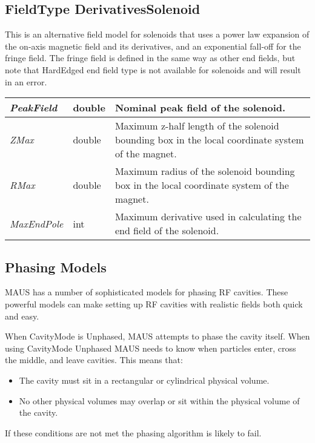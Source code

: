 \subsection{FieldType DerivativesSolenoid}
This is an alternative field model for solenoids that uses a power law expansion of the on-axis magnetic field and its
derivatives, and an exponential fall-off for the fringe field. The fringe field is defined in the same way as other end
fields, but note that HardEdged end field type is not available for solenoids and will result in an error.

\begin{center}
\tabletail{}
\tablelasttail{}
\begin{supertabular}{|m{3.665cm}|m{1.278cm}|m{12.052cm}|}
\hline
{\itshape PeakField} &
double &
Nominal peak field of the solenoid.\\\hline
{\itshape ZMax} &
double &
Maximum z-half length of the solenoid bounding box in the local coordinate system of the magnet.\\\hline
{\itshape RMax} &
double &
Maximum radius of the solenoid bounding box in the local coordinate system of the magnet.\\\hline
{\itshape MaxEndPole} &
int &
Maximum derivative used in calculating the end field of the solenoid.\\\hline
\end{supertabular}
\end{center}
\subsection{Phasing Models}
MAUS has a number of sophisticated models for phasing RF cavities. These powerful models can make setting up RF
cavities with realistic fields both quick and easy.

When CavityMode is Unphased, MAUS attempts to phase the cavity itself. When using CavityMode Unphased MAUS needs to
know when particles enter, cross the middle, and leave cavities. This means that:

\liststyleLxiii
\begin{itemize}
\item The cavity must sit in a rectangular or cylindrical physical volume.
\item No other physical volumes may overlap or sit within the physical volume of the cavity.
\end{itemize}
If these conditions are not met the phasing algorithm is likely to fail.


